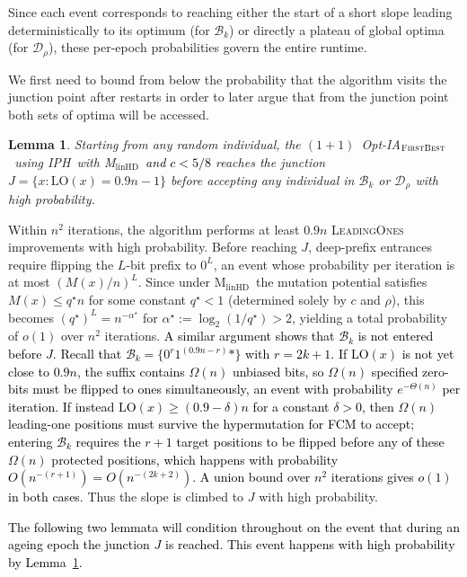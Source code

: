 \documentclass[lettersize,journal]{IEEEtran}
\newcommand{\rerev}[1]{\textcolor{black}{#1}}
\newcommand{\linHD}{M$_{\text{linHD}}$}
\newcommand{\IPHfcm}{IPH}
\newtheorem{lemma}{Lemma}
\begin{document}
Since each event corresponds to reaching either the start of a short slope leading deterministically to its optimum (for $\mathcal{B}_k$) or directly a plateau of global optima (for $\mathcal{D}_\rho$), these per-epoch probabilities govern the entire runtime.

We first need to bound from below the probability that the algorithm visits the junction point after restarts in order to later argue that from the junction point both sets of optima will be accessed.

\begin{lemma} \label{lem:junction-first-density-Bk}
	Starting from any random individual, the $(1+1)$~Opt-IA$_{\textsc{FirstBest}}$~using \IPHfcm{}~with \linHD~\textcolor{black}{and $c<5/8$}  reaches the junction $J = \{x : \mathrm{LO}(x)=0.9n-1\}$ before accepting any individual in $\mathcal{B}_k$ or $\mathcal{D}_\rho$ with high probability.
\end{lemma}

Within $n^2$ iterations, the algorithm performs at least $0.9n$ \textsc{LeadingOnes} 
improvements with high probability.  
Before reaching $J$, deep-prefix entrances require flipping the $L$-bit prefix 
to $0^L$, an event whose probability per iteration is at most $(M(x)/n)^L$.  
Since under \linHD\ the mutation potential satisfies $M(x) \le q^\star n$ for 
some constant $q^\star < 1$ (determined solely by $c$ and $\rho$), this becomes 
$(q^\star)^L = n^{-\alpha^\star}$ for $\alpha^\star := \log_2(1/q^\star) > 2$, 
yielding a total probability of $o(1)$ over $n^2$ iterations.
\rerev{A similar argument shows that $\mathcal{B}_k$ is not entered before $J$.
Recall that $\mathcal{B}_k = \{0^r 1^{(0.9n-r)}*\}$ with $r = 2k+1$.
If $\mathrm{LO}(x)$ is not yet close to $0.9n$, the suffix contains
$\Omega(n)$ unbiased bits, so $\Omega(n)$ specified zero-bits must be
flipped to ones simultaneously, an event with probability
$e^{-\Theta(n)}$ per iteration.
If instead $\mathrm{LO}(x) \geq (0.9-\delta)n$ for a constant $\delta > 0$,
then $\Omega(n)$ leading-one positions must survive the hypermutation
for FCM to accept; entering $\mathcal{B}_k$ requires the $r+1$ target
positions to be flipped before any of these $\Omega(n)$ protected
positions, which happens with probability $O(n^{-(r+1)}) = O(n^{-(2k+2)})$.
A union bound over $n^2$ iterations gives $o(1)$ in both cases.}
Thus the slope is climbed to $J$ with high probability.



\textcolor{black}{The following two lemmata will condition throughout on the event that during an ageing epoch the junction $J$ is reached.
This event happens with high probability by Lemma~\ref{lem:junction-first-density-Bk}.}
\end{document}

